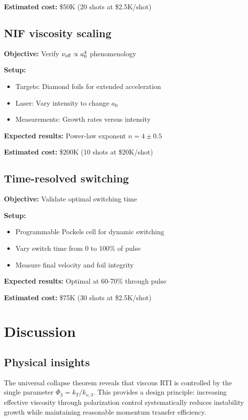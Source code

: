 \documentclass[aps,pre,twocolumn,showpacs,superscriptaddress]{revtex4-2}
\theoremstyle{definition}
\begin{document}
\textbf{Estimated cost:} \$50K (20 shots at \$2.5K/shot)

\subsection{NIF viscosity scaling}

\textbf{Objective:} Verify $\nu_{\rm eff} \propto a_0^4$ phenomenology

\textbf{Setup:}
\begin{itemize}
\item Targets: Diamond foils for extended acceleration
\item Laser: Vary intensity to change $a_0$
\item Measurements: Growth rates versus intensity
\end{itemize}

\textbf{Expected results:} Power-law exponent $n = 4 \pm 0.5$

\textbf{Estimated cost:} \$200K (10 shots at \$20K/shot)

\subsection{Time-resolved switching}

\textbf{Objective:} Validate optimal switching time

\textbf{Setup:}
\begin{itemize}
\item Programmable Pockels cell for dynamic switching
\item Vary switch time from 0 to 100\% of pulse
\item Measure final velocity and foil integrity
\end{itemize}

\textbf{Expected results:} Optimal at 60-70\% through pulse

\textbf{Estimated cost:} \$75K (30 shots at \$2.5K/shot)

\section{Discussion}\label{sec:discussion}

\subsection{Physical insights}

The universal collapse theorem reveals that viscous RTI is controlled by the single parameter $\Phi_3 = k_T/k_{\nu,3}$. This provides a design principle: increasing effective viscosity through polarization control systematically reduces instability growth while maintaining reasonable momentum transfer efficiency.
\end{document}
